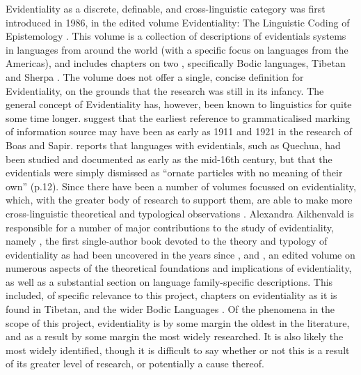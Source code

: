 Evidentiality as a discrete, definable, and cross-linguistic category was first introduced in 1986, in the edited volume Evidentiality: The Linguistic Coding of Epistemology \cite{ChafeNichols1986}. This volume is a collection of descriptions of evidentials systems in languages from around the world (with a specific focus on languages from the Americas), and includes chapters on two \lfam, specifically Bodic languages, Tibetan \cite{DeLancey1986} and Sherpa \cite{Woodbury1986}. The volume does not offer a single, concise definition for Evidentiality, on the grounds that the research was still in its infancy. The general concept of Evidentiality has, however, been known to linguistics for quite some time longer.  suggest that the earliest reference to grammaticalised marking of information source may have been as early as 1911 and 1921 in the research of Boas and Sapir.  reports that languages with evidentials, such as Quechua, had been studied and documented as early as the mid-16th century, but that the evidentials were simply dismissed as ``ornate particles with no meaning of their own'' (p.12). Since  there have been a number of volumes focussed on evidentiality, which, with the greater body of research to support them, are able to make more cross-linguistic theoretical and typological observations \cite{DendaleTasmowski2001}. Alexandra Aikhenvald is responsible for a number of major contributions to the study of evidentiality, namely , the first single-author book devoted to the theory and typology of evidentiality as had been uncovered in the years since , and , an edited volume on numerous aspects of the theoretical foundations and implications of evidentiality, as well as a substantial section on language family-specific descriptions. This included, of specific relevance to this project, chapters on evidentiality as it is found in Tibetan, and the wider Bodic Languages \cites{DeLancey2018Evidentiality}{Hyslop2018Evidentiality}. Of the phenomena in the scope of this project, evidentiality is by some margin the oldest in the literature, and as a result by some margin the most widely researched. It is also likely the most widely identified, though it is difficult to say whether or not this is a result of its greater level of research, or potentially a cause thereof.

